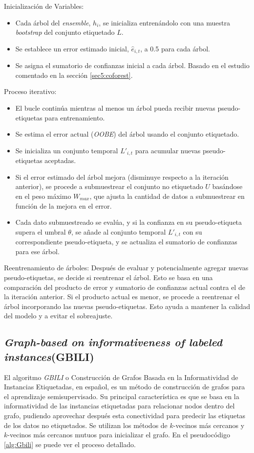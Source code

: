 \clearpage

Inicialización de Variables:
\begin{itemize}
	\item Cada árbol del \textit{ensemble}, $h_i$, se inicializa entrenándolo con una muestra \textit{bootstrap} del conjunto etiquetado $L$.
	\item Se establece un error estimado inicial, $\hat{e}_{i,t}$, a 0.5 para cada árbol.
	\item Se asigna el sumatorio de confianzas inicial a cada árbol. Basado en el estudio comentado en la sección \ref{sec5:coforest}.
\end{itemize}

Proceso iterativo:
\begin{itemize}
	\item El bucle continúa mientras al menos un árbol pueda recibir nuevas pseudo-etiquetas para entrenamiento.
	\item Se estima el error actual (\textit{OOBE}) del árbol usando el conjunto etiquetado.
	\item Se inicializa un conjunto temporal $L'_{i,t}$ para acumular nuevas pseudo-etiquetas aceptadas.
	\item Si el error estimado del árbol mejora (disminuye respecto a la iteración anterior), se procede a submuestrear el conjunto no etiquetado $U$ basándose en el peso máximo $W_{max}$, que ajusta la cantidad de datos a submuestrear en función de la mejora en el error.
	\item Cada dato submuestreado se evalúa, y si la confianza en su pseudo-etiqueta supera el umbral $\theta$, se añade al conjunto temporal $L'_{i,t}$ con su correspondiente pseudo-etiqueta, y se actualiza el sumatorio de confianzas para ese árbol.
\end{itemize}

Reentrenamiento de árboles:
Después de evaluar y potencialmente agregar nuevas pseudo-etiquetas, se decide si reentrenar el árbol. Esto se basa en una comparación del producto de error y sumatorio de confianzas actual contra el de la iteración anterior. Si el producto actual es menor, se procede a reentrenar el árbol incorporando las nuevas pseudo-etiquetas. Esto ayuda a mantener la calidad del modelo y a evitar el sobreajuste.

\subsection{\textit{ Graph-based on informativeness of
labeled instances}(GBILI)}
El algoritmo \textit{GBILI} o Construcción de Grafos Basada en la Informatividad de Instancias Etiquetadas, en español, es un método de construcción de grafos para el aprendizaje semisupervisado. Su principal característica es que se basa en la informatividad de las instancias etiquetadas para relacionar nodos dentro del grafo, pudiendo aprovechar después esta conectividad para predecir las etiquetas de los datos no etiquetados. Se utilizan los métodos de $k$-vecinos más cercanos y  $k$-vecinos más cercanos mutuos para inicializar el grafo. En el pseudocódigo \ref{alg:Gbili} se puede ver el proceso detallado.

